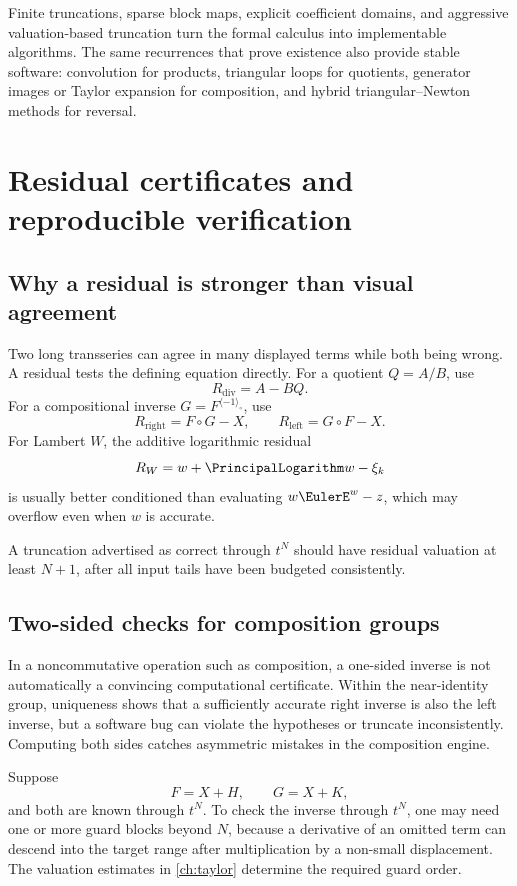 \documentclass[11pt,openany]{book}
\theoremstyle{definition}
\theoremstyle{plain}
\theoremstyle{remark}
\newcommand{\invcomp}{^{\langle -1\rangle_{\circ}}}
\begin{document}
\begin{summarybox}
Finite truncations, sparse block maps, explicit coefficient domains, and aggressive valuation-based truncation turn the formal calculus into implementable algorithms. The same recurrences that prove existence also provide stable software: convolution for products, triangular loops for quotients, generator images or Taylor expansion for composition, and hybrid triangular--Newton methods for reversal.
\end{summarybox}

\chapter{Residual certificates and reproducible verification}\label{ch:verification}

\section{Why a residual is stronger than visual agreement}
Two long transseries can agree in many displayed terms while both being wrong. A residual tests the defining equation directly. For a quotient \(Q=A/B\), use
\[
 R_{\mathrm{div}}=A-BQ.
\]
For a compositional inverse \(G=F\invcomp\), use
\[
 R_{\mathrm{right}}=F\circ G-X,
 \qquad
 R_{\mathrm{left}}=G\circ F-X.
\]
For Lambert \(W\), the additive logarithmic residual
\[
 R_W=w+\PrincipalLogarithm w-\xi_k
\]
is usually better conditioned than evaluating \(w\EulerE^w-z\), which may overflow even when \(w\) is accurate.

A truncation advertised as correct through \(t^N\) should have residual valuation at least \(N+1\), after all input tails have been budgeted consistently.


\section{Two-sided checks for composition groups}
In a noncommutative operation such as composition, a one-sided inverse is not automatically a convincing computational certificate. Within the near-identity group, uniqueness shows that a sufficiently accurate right inverse is also the left inverse, but a software bug can violate the hypotheses or truncate inconsistently. Computing both sides catches asymmetric mistakes in the composition engine.

Suppose
\[
 F=X+H,\qquad G=X+K,
\]
and both are known through \(t^N\). To check the inverse through \(t^N\), one may need one or more guard blocks beyond \(N\), because a derivative of an omitted term can descend into the target range after multiplication by a non-small displacement. The valuation estimates in \cref{ch:taylor} determine the required guard order.
\end{document}
